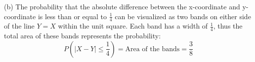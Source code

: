 \documentclass{article}
\begin{document}
\begin{itemize}
      (b) The probability that the absolute difference between the x-coordinate and y-coordinate is less than or equal to $\frac{1}{4}$ can be visualized as two bands on either side of the line $Y = X$ within the unit square. Each band has a width of $\frac{1}{4}$, thus the total area of these bands represents the probability:
      \[ P(|X - Y| \leq \frac{1}{4}) = \text{Area of the bands} = \frac{3}{8}\]
      
      









\end{itemize}
\end{document}
